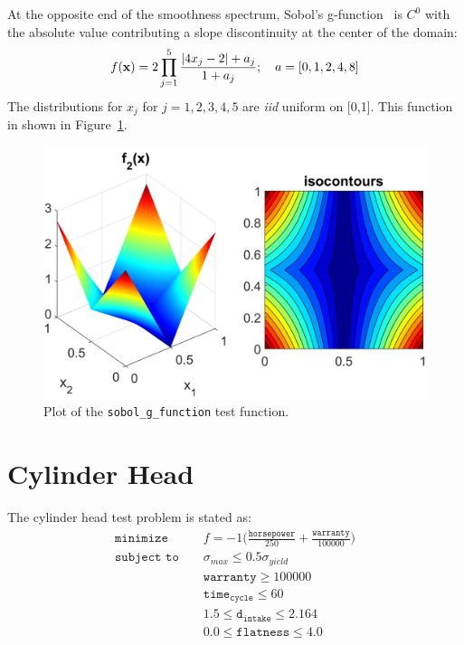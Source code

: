 At the opposite end of the smoothness spectrum, Sobol's
g-function~\cite{storlie_09} is $C^0$ with the absolute value
contributing a slope discontinuity at the center of the domain:
\begin{equation}
f({\bf x}) = 2 \prod_{j=1}^5 \frac{|4x_j - 2| + a_j}{1+a_j};
~~~a = [0, 1, 2, 4, 8]
\end{equation}
The distributions for $x_j$ for $j=1,2,3,4,5$ are {\it iid}
uniform on [0,1]. 
This function in shown in Figure~\ref{fig:sobol_g_function}.
\begin{figure}
  \centering
  \includegraphics[scale=0.7]{images/sobol_g_function}
  \caption{Plot of the \texttt{sobol\_g\_function} test function.}
  \label{fig:sobol_g_function}
\end{figure}


\section{Cylinder Head}\label{additional:cylinder}

The cylinder head test problem is stated as:
\begin{eqnarray}
\texttt{minimize }   & & f=-1\bigg(\frac{\mathtt{horsepower}}{250}+
  \frac{\mathtt{warranty}}{100000}\bigg) \nonumber\\
\texttt{subject to } & & \sigma_{max} \leq 0.5 \sigma_{yield}
  \label{additional:cylhead}\\
                     & & \mathtt{warranty} \geq 100000          \nonumber\\
                     & & \mathtt{time_{cycle}} \leq 60          \nonumber\\
                     & & 1.5 \leq \mathtt{d_{intake}} \leq 2.164\nonumber\\
                     & & 0.0 \leq \mathtt{flatness} \leq 4.0    \nonumber
\end{eqnarray}


